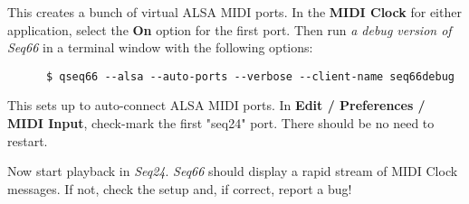   This creates a bunch of virtual ALSA MIDI ports.
   In the \textbf{MIDI Clock} for either application,
   select the \textbf{On} option for the first port.
   Then run \textsl{a debug version of Seq66} in a terminal window
   with the following options:

   \begin{verbatim}
      $ qseq66 --alsa --auto-ports --verbose --client-name seq66debug
   \end{verbatim}

   This sets up to auto-connect ALSA MIDI ports.  In
   \textbf{Edit / Preferences / MIDI Input}, check-mark the first
   "seq24" port.  There should be no need to restart.

   Now start playback in \textsl{Seq24}.
   \textsl{Seq66} should display a rapid stream of MIDI Clock messages.
   If not, check the setup and, if correct, report a bug!

